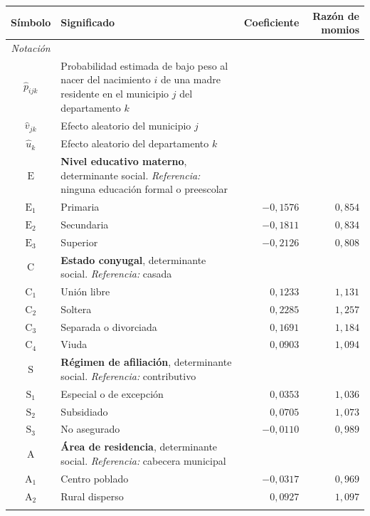 \begin{tabular}{@{}c p{} r r@{}}
\toprule
\textbf{Símbolo} & \textbf{Significado} & \textbf{Coeficiente} & \textbf{Razón de momios} \\
\midrule
\textit{Notación} &  &  &  \\
$\hat{p}_{ijk}$ & Probabilidad estimada de bajo peso al nacer del nacimiento $i$ de una madre residente en el municipio $j$ del departamento $k$ &  &  \\
$\hat{v}_{jk}$ & Efecto aleatorio del municipio $j$ &  &  \\
$\hat{u}_{k}$ & Efecto aleatorio del departamento $k$ &  &  \\
\addlinespace
$\mathrm{E}$ & \textbf{Nivel educativo materno}, determinante social. \textit{Referencia:} ninguna educación formal o preescolar &  &  \\
$\mathrm{E}_{1}$ & Primaria & $-0{,}1576$ & $0{,}854$ \\
$\mathrm{E}_{2}$ & Secundaria & $-0{,}1811$ & $0{,}834$ \\
$\mathrm{E}_{3}$ & Superior & $-0{,}2126$ & $0{,}808$ \\
\addlinespace
$\mathrm{C}$ & \textbf{Estado conyugal}, determinante social. \textit{Referencia:} casada &  &  \\
$\mathrm{C}_{1}$ & Unión libre & $0{,}1233$ & $1{,}131$ \\
$\mathrm{C}_{2}$ & Soltera & $0{,}2285$ & $1{,}257$ \\
$\mathrm{C}_{3}$ & Separada o divorciada & $0{,}1691$ & $1{,}184$ \\
$\mathrm{C}_{4}$ & Viuda & $0{,}0903$ & $1{,}094$ \\
\addlinespace
$\mathrm{S}$ & \textbf{Régimen de afiliación}, determinante social. \textit{Referencia:} contributivo &  &  \\
$\mathrm{S}_{1}$ & Especial o de excepción & $0{,}0353$ & $1{,}036$ \\
$\mathrm{S}_{2}$ & Subsidiado & $0{,}0705$ & $1{,}073$ \\
$\mathrm{S}_{3}$ & No asegurado & $-0{,}0110$ & $0{,}989$ \\
\addlinespace
$\mathrm{A}$ & \textbf{Área de residencia}, determinante social. \textit{Referencia:} cabecera municipal &  &  \\
$\mathrm{A}_{1}$ & Centro poblado & $-0{,}0317$ & $0{,}969$ \\
$\mathrm{A}_{2}$ & Rural disperso & $0{,}0927$ & $1{,}097$ \\
\addlinespace

\end{tabular}
